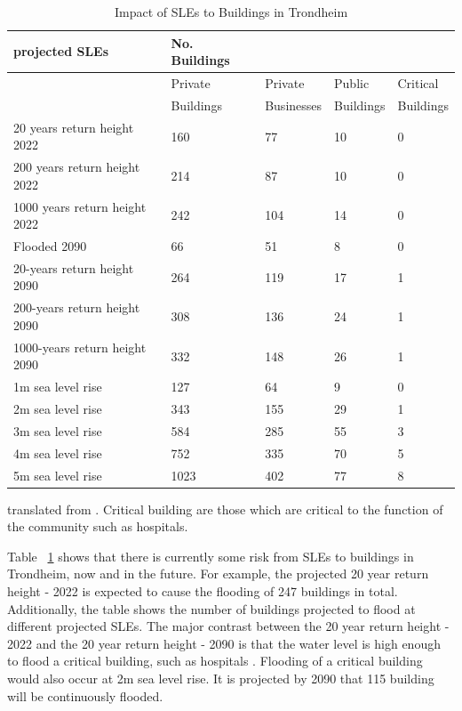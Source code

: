 \begin{table}[H]
    \centering
    \begin{tabular}{|l|l|l|l|l|}
    \hline
        \textbf{projected SLEs }& \textbf{No. Buildings}  & ~ & ~ & ~ \\ \hline
        ~ & Private & Private & Public  & Critical  \\ \newline
        ~ & Buildings & Businesses & Buildings & Buildings \\ \hline        
        20 years return height 2022 & 160 & 77 & 10 & 0 \\ \hline
        200 years return height 2022 & 214 & 87 & 10 & 0 \\ \hline
        1000 years return height 2022 & 242 & 104 & 14 & 0 \\ \hline
        Flooded 2090 & 66 & 51 & 8 & 0 \\ \hline
        20-years return height 2090 & 264 & 119 & 17 & 1 \\ \hline
        200-years return height  2090 & 308 & 136 & 24 & 1 \\ \hline
        1000-years return height  2090 & 332 & 148 & 26 & 1 \\ \hline
        1m sea level rise & 127 & 64 & 9 & 0 \\ \hline
        2m sea level rise & 343 & 155 & 29 & 1 \\ \hline
        3m sea level rise & 584 & 285 & 55 & 3 \\ \hline
        4m sea level rise & 752 & 335 & 70 & 5 \\ \hline
        5m sea level rise & 1023 & 402 & 77 & 8 \\ \hline
    \end{tabular}
    \caption{Impact of SLEs to Buildings in Trondheim }{translated from \cite{kartverket_se_2021}. Critical building are those which are critical to the function of the community such as hospitals. }
    \label{table:building-impact-sle}
\end{table}


Table ~\ref{table:building-impact-sle} shows that there is currently some risk from SLEs to buildings in Trondheim, now and in the future. For example, the projected 20 year return height - 2022 is expected to cause the flooding of 247 buildings in total. Additionally, the table shows the number of buildings projected to flood at different projected SLEs. The major contrast between the 20 year return height - 2022 and the 20 year return height - 2090 is that the water level is high enough to flood a critical building, such as hospitals . Flooding of a critical building would also occur at 2m sea level rise. It is projected by 2090 that 115 building will be continuously flooded.
